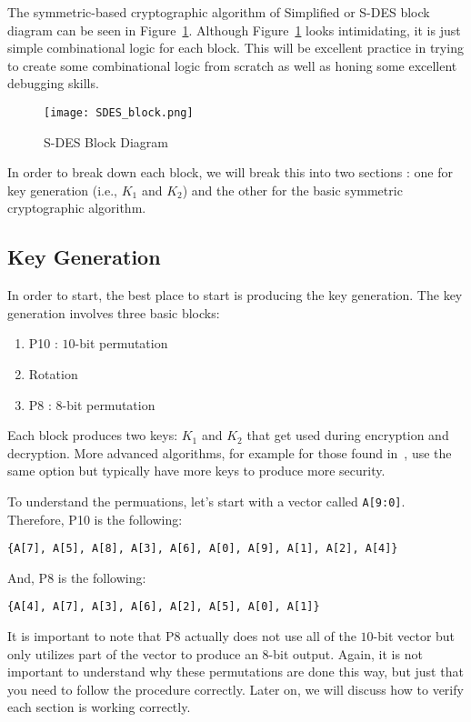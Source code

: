 \documentclass{article}
\begin{document}
The symmetric-based cryptographic
algorithm of Simplified or S-DES block diagram
can be seen in
Figure~\ref{SDES_block.png}.  Although Figure~\ref{SDES_block.png}
looks intimidating, it is just simple combinational logic for each
block.  This will be excellent practice in trying to create some
combinational logic from scratch as well as honing some excellent
debugging skills.  
\begin{figure}
  \centering
  \texttt{[image: SDES\_block.png]}
  \caption{S-DES Block Diagram}
  \label{SDES_block.png}
\end{figure}
In order to break down each block, we will break this into two
sections : one for key generation (i.e., $K_1$ and $K_2$) and the
other for the basic symmetric cryptographic algorithm.

\subsection{Key Generation}

In order to start, the best place to start is producing the key
generation.  The key generation involves three basic blocks:
\begin{enumerate}
\item P10 : $10$-bit permutation
\item Rotation
\item P8 : $8$-bit permutation
\end{enumerate}
Each block produces two keys: $K_1$ and $K_2$ that get used during
encryption and decryption.  More advanced algorithms, for example for
those found in~\cite{10.5555/1721909}, use the same option but
typically have more keys to produce more security.

To understand the
permuations, let's start with a vector called \verb!A[9:0]!.  Therefore, P10 is the following:
\begin{verbatim}
{A[7], A[5], A[8], A[3], A[6], A[0], A[9], A[1], A[2], A[4]}
\end{verbatim}
And, P8 is the following:
\begin{verbatim}
{A[4], A[7], A[3], A[6], A[2], A[5], A[0], A[1]}
\end{verbatim}
It is important to note that P8 actually does not use all of the
$10$-bit vector but only utilizes part of the vector to produce an
$8$-bit output.
Again, it is not important to understand why these permutations are
done this way, but just that you need to follow the procedure
correctly.  Later on, we will discuss how to verify each section is
working correctly.
\end{document}
